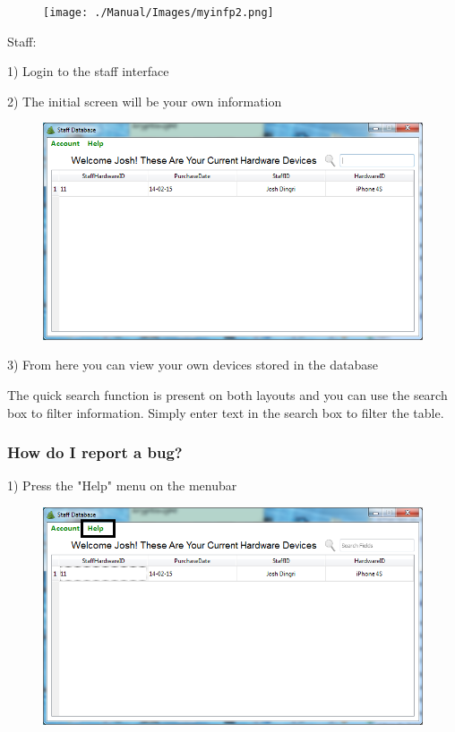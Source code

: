 \begin{figure}[H]
    \texttt{[image: ./Manual/Images/myinfp2.png]}
\end{figure}

Staff:

1) Login to the staff interface

2) The initial screen will be your own information

\begin{figure}[H]
    \includegraphics[width=\textwidth]{./Manual/Images/myinfostaff.png}
\end{figure}

3) From here you can view your own devices stored in the database

The quick search function is present on both layouts and you can use the search box to filter information. Simply enter text in the search box to filter the table.

\subsubsection{How do I report a bug?}

1) Press the "Help" menu on the menubar

\begin{figure}[H]
    \includegraphics[width=\textwidth]{./Manual/Images/bugreport.png}
\end{figure}

